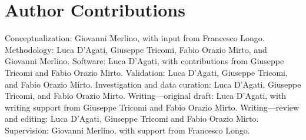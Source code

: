 \section*{Author Contributions}
Conceptualization: Giovanni Merlino, with input from Francesco Longo. Methodology: Luca D'Agati, Giuseppe Tricomi, Fabio Orazio Mirto, and Giovanni Merlino. Software: Luca D'Agati, with contributions from Giuseppe Tricomi and Fabio Orazio Mirto. Validation: Luca D'Agati, Giuseppe Tricomi, and Fabio Orazio Mirto. Investigation and data curation: Luca D'Agati, Giuseppe Tricomi, and Fabio Orazio Mirto. Writing---original draft: Luca D'Agati, with writing support from Giuseppe Tricomi and Fabio Orazio Mirto. Writing---review and editing: Luca D'Agati, Giuseppe Tricomi and Fabio Orazio Mirto. Supervision: Giovanni Merlino, with support from Francesco Longo.
